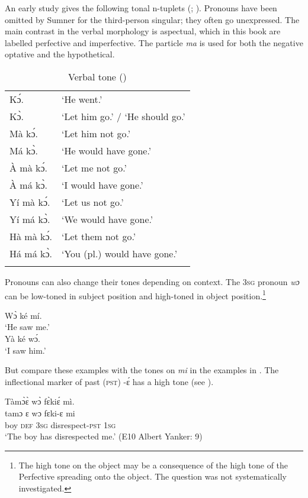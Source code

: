 An early study gives the following tonal n-tuplets (\citealt[35]{Sumner1921}; ). Pronouns have been omitted by Sumner for the third-person singular; they often go unexpressed. The main contrast in the verbal morphology is aspectual, which in this book are labelled perfective and imperfective. The particle \textit{ma} is used for both the negative optative and the hypothetical.
\clearpage
\begin{table}
\caption{\label{tab:phon:12}Verbal tone ({\citealt[35]{Sumner1921}})}
\begin{tabular}{ll} 
\lsptoprule
Kɔ́. & ‘He went.'\\
Kɔ̀. & ‘Let him go.' / ‘He should go.'\\
Mà kɔ́. & ‘Let him not go.'\\
Má kɔ̀. & ‘He would have gone.'\\
\tablevspace
À mà kɔ́. & ‘Let me not go.'\\
À má kɔ̀. & ‘I would have gone.'\\
\tablevspace
Yí mà kɔ́. & ‘Let us not go.'\\
Yí má kɔ̀. & ‘We would have gone.'\\
\tablevspace
Hà mà kɔ́. & ‘Let them not go.'\\
Há má kɔ̀. & ‘You (pl.) would have gone.'\\
\lspbottomrule
\end{tabular}
\end{table}

Pronouns can also change their tones depending on context. The 3\textsc{sg} pronoun \textit{wɔ} can be low-toned in subject position and high-toned in object position.\footnote{The high tone on the object may be a consequence of the high tone of the Perfective spreading onto the object. The question was not systematically investigated.}

\ea%
\label{ex:31}
\ea Wɔ̀ ké mí.\\
‘He saw me.'\\
\ex
Yà ké wɔ́.\\
‘I saw him.'\\
\z
\z

But compare these examples with the tones on \textit{mi} in the examples in . The inflectional marker of past (\textsc{pst}) -ɛ́ has a high tone (see ).

\ea%
\label{ex:32}
\ea Tàmɔ̀ɛ̀ wɔ̀ fɛ̀kiɛ́ mì.\\
\gll tamɔ  ɛ    wɔ    fɛki-ɛ        mi\\
boy  \textsc{def}  \textsc{3sg}  disrespect-\textsc{pst}  \textsc{1sg}\\
\glt ‘The boy has disrespected me.' (E10 Albert Yanker: 9)

